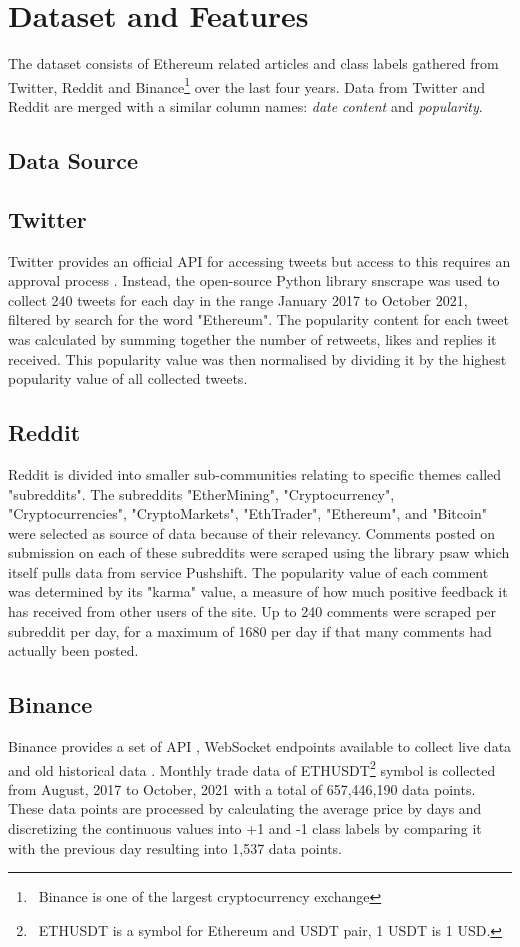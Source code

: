 \documentclass[transmag]{IEEEtran}
\begin{document}
\section{Dataset and Features}
The dataset consists of Ethereum related articles and class labels gathered from Twitter, Reddit and Binance\footnote{\ Binance is one of the largest cryptocurrency exchange} over the last four years. Data from Twitter and Reddit are merged with a similar column names: \emph{date} \emph{content} and \emph{popularity}.

\subsection{Data Source}

\subsection{Twitter}
Twitter provides an official API for accessing tweets but access to this requires an approval process \cite{twitter_api_docs}. Instead, the open-source Python library snscrape \cite{snscrape_git} was used to collect 240 tweets for each day in the range January 2017 to October 2021, filtered by search for the word "Ethereum". The popularity content for each tweet was calculated by summing together the number of retweets, likes and replies it received. This popularity value was then normalised by dividing it by the highest popularity value of all collected tweets.

\subsection{Reddit}
Reddit is divided into smaller sub-communities relating to specific themes called "subreddits". The subreddits "EtherMining", "Cryptocurrency", "Cryptocurrencies", "CryptoMarkets", "EthTrader", "Ethereum", and "Bitcoin" were selected as source of data because of their relevancy. Comments posted on submission on each of these subreddits were scraped using the library psaw which itself pulls data from service Pushshift. The popularity value of each comment was determined by its "karma" value, a measure of how much positive feedback it has received from other users of the site. Up to 240 comments were scraped per subreddit per day, for a maximum of 1680 per day if that many comments had actually been posted.


\subsection{Binance}
Binance provides a set of API \cite{binance_web_socket}, WebSocket endpoints available to collect live data and old historical data \cite{binance_public_data}. Monthly trade data of ETHUSDT\footnote{\ ETHUSDT is a symbol for Ethereum and USDT pair, 1 USDT is 1 USD.} symbol is collected from August, 2017 to October, 2021 with a total of 657,446,190 data points. These data points are processed by calculating the average price by days and discretizing the continuous values into +1 and -1 class labels by comparing it with the previous day resulting into 1,537 data points.
\end{document}

